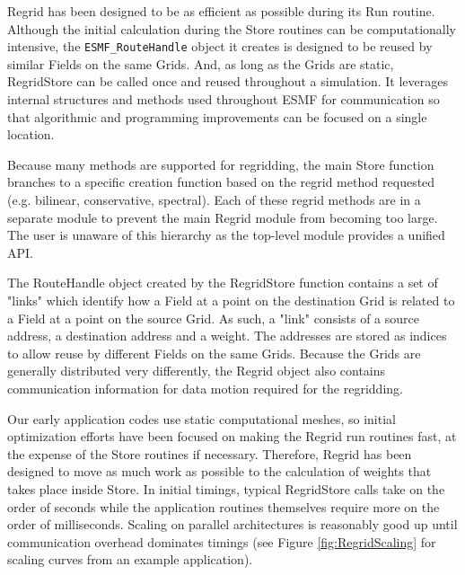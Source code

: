 


Regrid has been designed to be as efficient as possible during its
Run routine.  Although the initial calculation during the Store routines
can be computationally intensive, the {\tt ESMF\_RouteHandle} object
it creates is designed to be reused by similar Fields on the same Grids.
And, as long as the Grids are static, RegridStore can be called once
and reused throughout a simulation.  It leverages internal structures
and methods used throughout ESMF for communication so that algorithmic
and programming improvements can be focused on a single location.

Because many methods are supported for regridding, the main Store function
branches to a specific creation function based on the regrid method requested
(e.g. bilinear, conservative, spectral).  Each of these regrid methods are in
a separate module to prevent the main Regrid module from becoming too
large.  The user is unaware of this hierarchy as the top-level module provides
a unified API.

The RouteHandle object created by the RegridStore function contains a set of
"links" which identify how a Field at a point on the destination Grid is
related to a Field at a point on the source Grid.  As such, a "link"
consists of a source address, a destination address and a weight.  The addresses
are stored as indices to allow reuse by different Fields on the same Grids.
Because the Grids are generally distributed very differently, the Regrid object
also contains communication information for data motion required for the
regridding.

Our early application codes use static computational meshes, so initial 
optimization efforts have been focused on making the Regrid run routines 
fast, at the expense of the Store routines if necessary.  Therefore, Regrid
has been designed to move as much work as possible to the calculation of weights
that takes place inside Store.  In initial timings, typical RegridStore calls
take on the order of seconds while the application routines themselves require
more on the order of milliseconds.  Scaling on parallel architectures is
reasonably good up until communication overhead dominates timings (see 
Figure \ref{fig:RegridScaling} for scaling curves from an example application).

